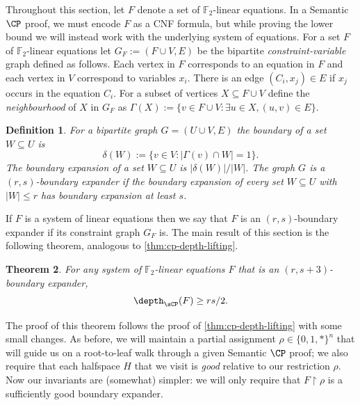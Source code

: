 \documentclass[11pt]{article}
\newtheorem{theorem}{Theorem}[section]
\newtheorem{definition}[theorem]{Definition}
\begin{document}
Throughout this section, let $F$ denote a set of $\mathbb{F}_2$-linear equations.
In a Semantic $\CP$ proof, we must encode $F$ as a CNF formula, but while proving the lower bound we will instead work with the underlying system of equations.
For a set $F$ of $\mathbb{F}_2$-linear equations let $G_F := (F \cup V, E)$ be the bipartite \emph{constraint-variable} graph defined as follows. 
Each vertex in $F$ corresponds to an equation in $F$ and each vertex in $V$ correspond to variables $x_i$. 
There is an edge $(C_i,x_j) \in E$ if $x_j$ occurs in the equation $C_i$.
For a subset of vertices $X \subseteq F \cup V$ define the \emph{neighbourhood} of $X$ in $G_F$ as $\Gamma(X):= \{v \in F \cup V : \exists u \in X, (u,v) \in E\}$.

\begin{definition}\label{def:expansion}
	For a bipartite graph $G=(U \cup V, E)$ the \emph{boundary} of a set $W \subseteq U$ is \[\delta(W):= \{v \in V : |\Gamma(v) \cap W| = 1\}.\]
	The \emph{boundary expansion} of a set $W \subseteq U$ is $|\delta(W)|/|W|$. 
	The graph $G$ is a $(r, s)$-\emph{boundary expander} if the boundary expansion of every set $W \subseteq U$ with $|W| \leq r$ has boundary expansion at least $s$.
\end{definition}

If $F$ is a system of linear equations then we say that $F$ is an $(r,s)$-boundary expander if its constraint graph $G_{F}$ is.
The main result of this section is the following theorem, analogous to \autoref{thm:cp-depth-lifting}.

\begin{theorem}\label{thm:expander-lb}
	For any system of $\mathbb{F}_2$-linear equations $F$ that is an $(r, s+3)$-boundary expander, \[\depth_{\sCP}(F) \geq rs/2.\]
\end{theorem}

The proof of this theorem follows the proof of \autoref{thm:cp-depth-lifting} with some small changes.
As before, we will maintain a partial assignment $\rho \in \{0,1,*\}^n$ that will guide us on a root-to-leaf walk through a given Semantic $\CP$ proof; we also require that each halfspace $H$ that we visit is \emph{good} relative to our restriction $\rho$.
Now our invariants are (somewhat) simpler: we will only require that $F \restriction \rho$ is a sufficiently good boundary expander.
\end{document}
